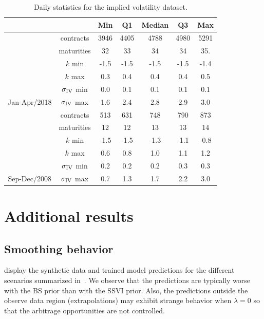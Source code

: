 \begin{table}
\caption{Daily statistics for the implied volatility dataset. \label{tab:sumstat}}
\centering
\begin{tabular}[t]{ccccccc}
\toprule
 &  & Min & Q1 & Median & Q3 & Max\\
\midrule
 & contracts & 3946 & 4405 & 4788 & 4980 & 5291\\
\cmidrule{2-7}
 & maturities & 32 & 33 & 34 & 34 & 35.\\
\cmidrule{2-7}
 & $k$ min & -1.5 & -1.5 & -1.5 & -1.5 & -1.4\\
\cmidrule{2-7}
 & $k$ max & 0.3 & 0.4 & 0.4 & 0.4 & 0.5\\
\cmidrule{2-7}
 & $\sigma_{\rm IV}$ min & 0.0 & 0.1 & 0.1 & 0.1 & 0.1\\
\cmidrule{2-7}
\multirow{-7}{*}{\centering\arraybackslash Jan-Apr/2018} & $\sigma_{\rm IV}$ max & 1.6 & 2.4 & 2.8 & 2.9 & 3.0\\
\cmidrule{1-7}
 & contracts & 513 & 631 & 748 & 790 & 873\\
\cmidrule{2-7}
 & maturities & 12 & 12 & 13 & 13 & 14\\
\cmidrule{2-7}
 & $k$ min & -1.5 & -1.5 & -1.3 & -1.1 & -0.8\\
\cmidrule{2-7}
 & $k$ max & 0.6 & 0.8 & 1.0 & 1.1 & 1.2\\
\cmidrule{2-7}
 & $\sigma_{\rm IV}$ min & 0.2 & 0.2 & 0.2 & 0.3 & 0.3\\
\cmidrule{2-7}
\multirow{-7}{*}{\centering\arraybackslash Sep-Dec/2008} & $\sigma_{\rm IV}$ max & 0.7 & 1.3 & 1.7 & 2.2 & 3.0\\
\bottomrule
\end{tabular}
\end{table}



\section{Additional results}\label{sec:additres}

\subsection{Smoothing behavior} \label{sec:smoothsynt}

 display the synthetic data and trained model predictions for the different scenarios summarized in~.
We observe that the predictions are typically worse with the BS prior than with the SSVI prior.
Also, the predictions outside the observe data region (extrapolations) may exhibit strange behavior when $\lambda=0$ so that the arbitrage opportunities are not controlled.

